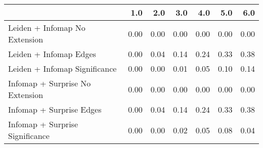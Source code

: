 \begin{tabular}{lrrrrrr}
\toprule
{} &  1.0 &  2.0 &  3.0 &  4.0 &  5.0 &  6.0 \\
\midrule
Leiden + Infomap No Extension   & 0.00 & 0.00 & 0.00 & 0.00 & 0.00 & 0.00 \\
Leiden + Infomap Edges          & 0.00 & 0.04 & 0.14 & 0.24 & 0.33 & 0.38 \\
Leiden + Infomap Significance   & 0.00 & 0.00 & 0.01 & 0.05 & 0.10 & 0.14 \\
Infomap + Surprise No Extension & 0.00 & 0.00 & 0.00 & 0.00 & 0.00 & 0.00 \\
Infomap + Surprise Edges        & 0.00 & 0.04 & 0.14 & 0.24 & 0.33 & 0.38 \\
Infomap + Surprise Significance & 0.00 & 0.00 & 0.02 & 0.05 & 0.08 & 0.04 \\
\bottomrule
\end{tabular}
